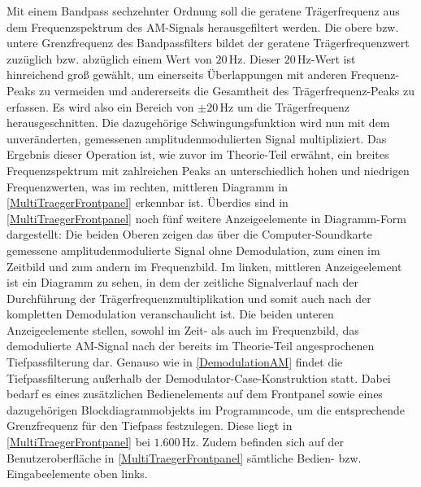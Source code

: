 \documentclass[
a4paper,
12pt,
pagesize,
ngerman
]{scrartcl}
\begin{document}
	\noindent Mit einem Bandpass sechzehnter Ordnung soll die geratene Trägerfrequenz aus dem Frequenzspektrum des AM-Signals herausgefiltert werden. Die obere bzw. untere Grenzfrequenz des Bandpassfilters bildet der geratene Trägerfrequenzwert zuzüglich bzw. abzüglich einem Wert von $20\,$Hz. Dieser $20\,$Hz-Wert ist hinreichend groß gewählt, um einerseits Überlappungen mit anderen Frequenz-Peaks zu vermeiden und andererseits die Gesamtheit des Trägerfrequenz-Peaks zu erfassen. Es wird also ein Bereich von $\pm 20\,$Hz um die Trägerfrequenz \glqq herausgeschnitten\glqq . Die dazugehörige Schwingungsfunktion wird nun mit dem unveränderten, gemessenen amplitudenmodulierten Signal multipliziert. Das Ergebnis dieser Operation ist, wie zuvor im Theorie-Teil erwähnt, ein breites Frequenzspektrum mit zahlreichen Peaks an unterschiedlich hohen und niedrigen Frequenzwerten, was im rechten, mittleren Diagramm in \cref{MultiTraegerFrontpanel} erkennbar ist. Überdies sind in \cref{MultiTraegerFrontpanel} noch fünf weitere Anzeigeelemente in Diagramm-Form dargestellt: Die beiden Oberen zeigen das über die Computer-Soundkarte gemessene amplitudenmodulierte Signal ohne Demodulation, zum einen im Zeitbild und zum andern im Frequenzbild. Im linken, mittleren Anzeigeelement ist ein Diagramm zu sehen, in dem der zeitliche Signalverlauf nach der Durchführung der Trägerfrequenzmultiplikation und somit auch nach der kompletten Demodulation veranschaulicht ist. Die beiden unteren Anzeigeelemente stellen, sowohl im Zeit- als auch im Frequenzbild, das demodulierte AM-Signal nach der bereits im Theorie-Teil angesprochenen Tiefpassfilterung dar. Genauso wie in \cref{DemodulationAM} findet die Tiefpassfilterung außerhalb der Demodulator-Case-Konstruktion statt. Dabei bedarf es eines zusätzlichen Bedienelements auf dem Frontpanel sowie eines dazugehörigen Blockdiagrammobjekts im Programmcode, um die entsprechende Grenzfrequenz für den Tiefpass festzulegen. Diese liegt in \cref{MultiTraegerFrontpanel} bei $1.600\,$Hz. Zudem befinden sich auf der Benutzeroberfläche in \cref{MultiTraegerFrontpanel} sämtliche Bedien- bzw. Eingabeelemente oben links.
	
\end{document}
